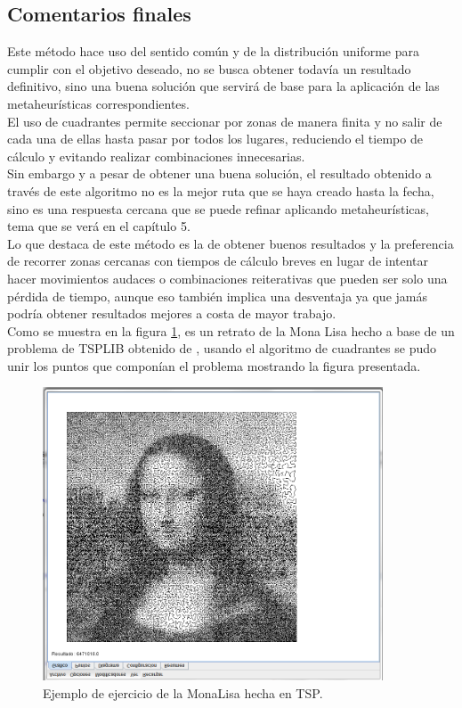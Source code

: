 \subsection{Comentarios finales}
Este método hace uso del sentido común y de la distribución uniforme para cumplir con el objetivo deseado, no se busca obtener todavía un resultado definitivo, sino una buena solución que servirá de base para la aplicación de las metaheurísticas correspondientes.\\
\hspace*{1cm} El uso de cuadrantes permite seccionar por zonas de manera finita y no salir de cada una de ellas hasta pasar por todos los lugares, reduciendo el tiempo de cálculo y evitando realizar combinaciones innecesarias.\\ 
\hspace*{1cm} Sin embargo y a pesar de obtener una buena solución, el resultado obtenido a través de este algoritmo no es la mejor ruta que se haya creado hasta la fecha, sino es una respuesta cercana que se puede refinar aplicando metaheurísticas, tema que se verá en el capítulo 5.\\
\hspace*{1cm} Lo que destaca de este método es la de obtener buenos resultados y la preferencia de recorrer zonas cercanas con tiempos de cálculo breves en lugar de intentar hacer movimientos audaces o combinaciones reiterativas que pueden ser solo una pérdida de tiempo, aunque eso también implica una desventaja ya que jamás podría obtener resultados mejores a costa de mayor trabajo.\\
\hspace*{1cm} Como se muestra en la figura \ref {fig:monalisatsp2.png}, es un retrato de la Mona Lisa hecho a base de un problema de TSPLIB obtenido de \cite{[MONALISA]}, usando el algoritmo de cuadrantes se pudo unir los puntos que componían el problema mostrando la figura presentada.
    \begin{figure}[hbtp]
        \centering
            \includegraphics[width=0.9\textwidth]{MetodoRectanguloAureo/Imagenes/monalisatsp.png}
            \caption{Ejemplo de ejercicio de la MonaLisa hecha en TSP.}
            \label{fig:monalisatsp2.png}
    \end{figure}